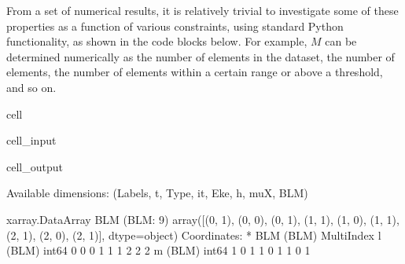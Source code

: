 \documentclass[letterpaper,table,10pt,english]{jupyterBook}
\begin{document}
\sphinxAtStartPar
From a set of numerical results, it is relatively trivial to investigate some of these properties as a function of various constraints, using standard Python functionality, as shown in the code blocks below. For example, \(M\) can be determined numerically as the number of elements in the dataset, the number of  elements, the number of elements within a certain range or above a threshold, and so on.

\begin{sphinxuseclass}{cell}\begin{sphinxVerbatimInput}

\begin{sphinxuseclass}{cell_input}
\begin{sphinxVerbatim}[commandchars=\\\{\}]


\end{sphinxVerbatim}

\end{sphinxuseclass}\end{sphinxVerbatimInput}
\begin{sphinxVerbatimOutput}

\begin{sphinxuseclass}{cell_output}
\begin{sphinxVerbatim}[commandchars=\\\{\}]
Available dimensions: (\PYGZsq{}Labels\PYGZsq{}, \PYGZsq{}t\PYGZsq{}, \PYGZsq{}Type\PYGZsq{}, \PYGZsq{}it\PYGZsq{}, \PYGZsq{}Eke\PYGZsq{}, \PYGZsq{}h\PYGZsq{}, \PYGZsq{}muX\PYGZsq{}, \PYGZsq{}BLM\PYGZsq{})
\end{sphinxVerbatim}

\begin{sphinxVerbatim}[commandchars=\\\{\}]
\PYGZlt{}xarray.DataArray \PYGZsq{}BLM\PYGZsq{} (BLM: 9)\PYGZgt{}
array([(0, \PYGZhy{}1), (0, 0), (0, 1), (1, \PYGZhy{}1), (1, 0), (1, 1), (2, \PYGZhy{}1), (2, 0),
       (2, 1)], dtype=object)
Coordinates:
  * BLM      (BLM) MultiIndex
  \PYGZhy{} l        (BLM) int64 0 0 0 1 1 1 2 2 2
  \PYGZhy{} m        (BLM) int64 \PYGZhy{}1 0 1 \PYGZhy{}1 0 1 \PYGZhy{}1 0 1
\end{sphinxVerbatim}

\end{sphinxuseclass}\end{sphinxVerbatimOutput}

\end{sphinxuseclass}
\end{document}
